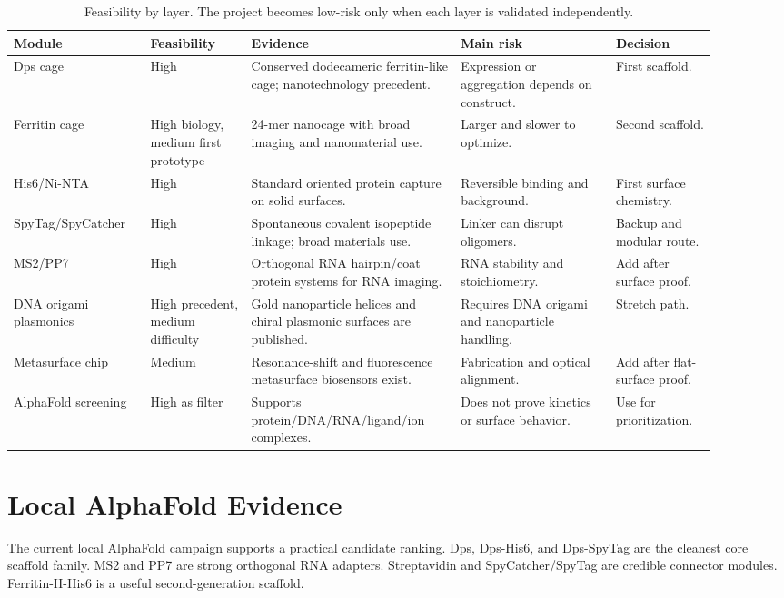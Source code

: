 \documentclass[11pt]{article}
\newcommand{\af}{AlphaFold}
\begin{document}
\begin{table}[H]
\centering
\small
\begin{tabular}{p{0.17\linewidth}p{0.13\linewidth}p{0.27\linewidth}p{0.20\linewidth}p{0.13\linewidth}}
\toprule
Module & Feasibility & Evidence & Main risk & Decision \\
\midrule
Dps cage & High & Conserved dodecameric ferritin-like cage; nanotechnology precedent. & Expression or aggregation depends on construct. & First scaffold. \\
Ferritin cage & High biology, medium first prototype & 24-mer nanocage with broad imaging and nanomaterial use. & Larger and slower to optimize. & Second scaffold. \\
His6/Ni-NTA & High & Standard oriented protein capture on solid surfaces. & Reversible binding and background. & First surface chemistry. \\
SpyTag/SpyCatcher & High & Spontaneous covalent isopeptide linkage; broad materials use. & Linker can disrupt oligomers. & Backup and modular route. \\
MS2/PP7 & High & Orthogonal RNA hairpin/coat protein systems for RNA imaging. & RNA stability and stoichiometry. & Add after surface proof. \\
DNA origami plasmonics & High precedent, medium difficulty & Gold nanoparticle helices and chiral plasmonic surfaces are published. & Requires DNA origami and nanoparticle handling. & Stretch path. \\
Metasurface chip & Medium & Resonance-shift and fluorescence metasurface biosensors exist. & Fabrication and optical alignment. & Add after flat-surface proof. \\
\af{} screening & High as filter & Supports protein/DNA/RNA/ligand/ion complexes. & Does not prove kinetics or surface behavior. & Use for prioritization. \\
\bottomrule
\end{tabular}
\caption{Feasibility by layer. The project becomes low-risk only when each layer is validated independently.}
\label{tab:feasibility}
\end{table}

\section{Local AlphaFold Evidence}

The current local \af{} campaign supports a practical candidate ranking. Dps, Dps-His6, and Dps-SpyTag are the cleanest core scaffold family. MS2 and PP7 are strong orthogonal RNA adapters. Streptavidin and SpyCatcher/SpyTag are credible connector modules. Ferritin-H-His6 is a useful second-generation scaffold.
\end{document}
